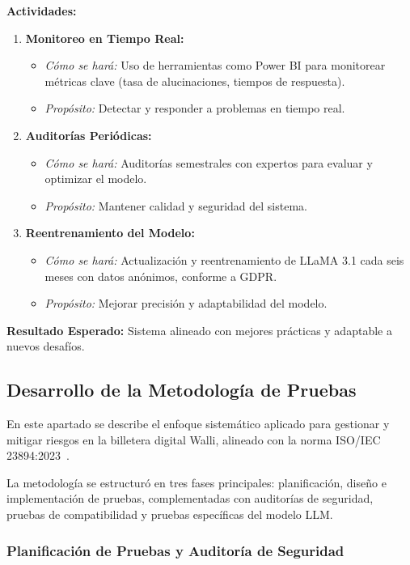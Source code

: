 \documentclass[12pt]{article}
\begin{document}
\textbf{Actividades:}
\begin{enumerate}
    \item \textbf{Monitoreo en Tiempo Real:}
        \begin{itemize}
            \item \textit{Cómo se hará:} Uso de herramientas como Power BI para monitorear métricas clave (tasa de alucinaciones, tiempos de respuesta).
            \item \textit{Propósito:} Detectar y responder a problemas en tiempo real.
        \end{itemize}
    \item \textbf{Auditorías Periódicas:}
        \begin{itemize}
            \item \textit{Cómo se hará:} Auditorías semestrales con expertos para evaluar y optimizar el modelo.
            \item \textit{Propósito:} Mantener calidad y seguridad del sistema.
        \end{itemize}
    \item \textbf{Reentrenamiento del Modelo:}
        \begin{itemize}
            \item \textit{Cómo se hará:} Actualización y reentrenamiento de LLaMA 3.1 cada seis meses con datos anónimos, conforme a GDPR.
            \item \textit{Propósito:} Mejorar precisión y adaptabilidad del modelo.
        \end{itemize}
\end{enumerate}

\textbf{Resultado Esperado:} Sistema alineado con mejores prácticas y adaptable a nuevos desafíos.

\subsection{Desarrollo de la Metodología de Pruebas}

En este apartado se describe el enfoque sistemático aplicado para gestionar y mitigar riesgos en la billetera digital Walli, alineado con la norma ISO/IEC 23894:2023~\cite{iso23894}. 

La metodología se estructuró en tres fases principales: planificación, diseño e implementación de pruebas, complementadas con auditorías de seguridad, pruebas de compatibilidad y pruebas específicas del modelo LLM.

\subsubsection{Planificación de Pruebas y Auditoría de Seguridad}
\end{document}
